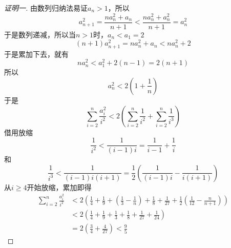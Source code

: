 \begin{proof}[证明一]
  由数列归纳法易证$a_n>1$，所以
\[ a_{n+1}^2=\frac{na_n^2+a_n}{n+1} < \frac{na_n^2+a_n^2}{n+1} = a_n^2 \]
于是数列递减，所以当$n>1$时，$a_n < a_1=2$
\[ (n+1)a_{n+1}^2 = na_n^2+a_n < na_n^2+2\]
于是累加下去，就有
\[ na_n^2 < a_1^2+2(n-1)=2(n+1) \]
所以
\[ a_n^2 < 2 \left( 1+\frac{1}{n} \right) \]
于是
\[ \sum_{i=2}^n \frac{a_i^2}{i^2} <2 \left( \sum_{i=2}^n \frac{1}{i^2}+\sum_{i=2}^n \frac{1}{i^3} \right) \]
借用放缩
\[ \frac{1}{i^2}<\frac{1}{(i-1)i}=\frac{1}{i-1}+\frac{1}{i} \]
和
\[ \frac{1}{i^3}<\frac{1}{(i-1)i(i+1)} = \frac{1}{2} \left( \frac{1}{(i-1)i}-\frac{1}{i(i+1)} \right) \]
从$i \geqslant 4$开始放缩，累加即得
\begin{align*}
\sum_{i=2}^n \frac{a_i^2}{i^2} & < 2 \left( \frac{1}{4}+\frac{1}{9}+(\frac{1}{3}-\frac{1}{n})+\frac{1}{8}+\frac{1}{27}+\frac{1}{2}(\frac{1}{12}-\frac{n}{n+1}) \right) \\
& < 2 \left( \frac{1}{4}+\frac{1}{9}+\frac{1}{3}+\frac{1}{8}+\frac{1}{27}+\frac{1}{24} \right) \\
& = 2 \left( \frac{3}{4}+\frac{4}{27} \right)<\frac{9}{5}
\end{align*}
\end{proof}

